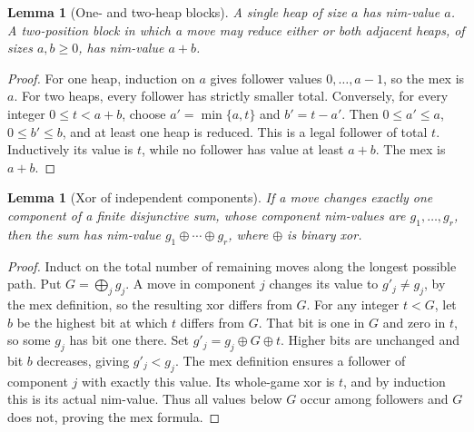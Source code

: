 \documentclass[11pt,a4paper]{article}
\newtheorem{lemma}[theorem]{Lemma}
\theoremstyle{definition}
\theoremstyle{remark}
\begin{document}
\begin{lemma}[One- and two-heap blocks]\label{le:block}
A single heap of size $a$ has nim-value $a$. A two-position block in which a move may reduce either or both adjacent heaps, of sizes $a,b\geq0$, has nim-value $a+b$.
\end{lemma}
\begin{proof}
For one heap, induction on $a$ gives follower values $0,\ldots,a-1$, so the mex is $a$. For two heaps, every follower has strictly smaller total. Conversely, for every integer $0\leq t<a+b$, choose $a'=\min\{a,t\}$ and $b'=t-a'$. Then $0\leq a'\leq a$, $0\leq b'\leq b$, and at least one heap is reduced. This is a legal follower of total $t$. Inductively its value is $t$, while no follower has value at least $a+b$. The mex is $a+b$.
\end{proof}

\begin{lemma}[Xor of independent components]\label{le:xor}
If a move changes exactly one component of a finite disjunctive sum, whose component nim-values are $g_1,\ldots,g_r$, then the sum has nim-value $g_1\mathbin\oplus\cdots\mathbin\oplus g_r$, where $\oplus$ is binary xor.
\end{lemma}
\begin{proof}
Induct on the total number of remaining moves along the longest possible path. Put $G=\bigoplus_jg_j$. A move in component $j$ changes its value to $g'_j\ne g_j$, by the mex definition, so the resulting xor differs from $G$. For any integer $t<G$, let $b$ be the highest bit at which $t$ differs from $G$. That bit is one in $G$ and zero in $t$, so some $g_j$ has bit one there. Set $g'_j=g_j\oplus G\oplus t$. Higher bits are unchanged and bit $b$ decreases, giving $g'_j<g_j$. The mex definition ensures a follower of component $j$ with exactly this value. Its whole-game xor is $t$, and by induction this is its actual nim-value. Thus all values below $G$ occur among followers and $G$ does not, proving the mex formula.
\end{proof}
\end{document}
